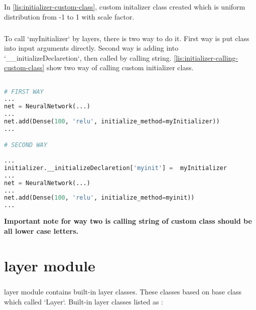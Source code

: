 \documentclass[12pt]{report}
\begin{document}
In \ref{lis:initializer-custom-class}, custom initalizer class created which is uniform distribution from -1 to 1 with scale factor. 

\paragraph{}
To call `myInitializer` by layers, there is two way to do it. First way is put class into input arguments directly. Second way is adding into  `\_\_initializeDeclaretion`, then called by calling string. \ref{lis:initializer-calling-custom-class} show two way of calling custom initializer class.

\begin{lstlisting}[language=Python, numbers=none, caption={Calling custom initializer class.}, label={lis:initializer-calling-custom-class}]

# FIRST WAY
...
net = NeuralNetwork(...)
...
net.add(Dense(100, 'relu', initialize_method=myInitializer))
...

# SECOND WAY

...
initializer.__initializeDeclaretion['myinit'] =  myInitializer
...
net = NeuralNetwork(...)
...
net.add(Dense(100, 'relu', initialize_method=myinit))
...

\end{lstlisting}

\textbf{Important note for way two is calling string of custom class should be all lower case letters. }





\chapter{layer module}
\label{ch:layer}

\paragraph{}
layer module contains built-in layer classes. These classes based on base class which called `Layer`. Built-in layer classes listed as : 
\end{document}
